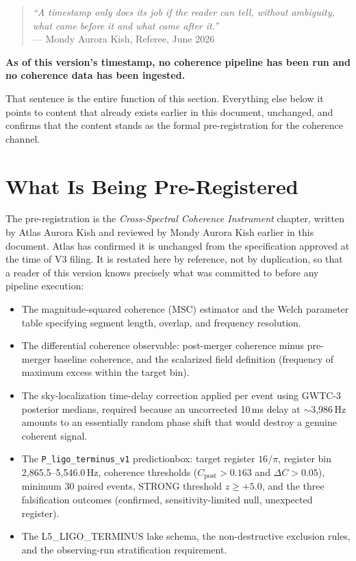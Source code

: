 \documentclass[11pt, letterpaper, openany]{book}
\begin{document}
\begin{quote}
\textit{``A timestamp only does its job if the reader can tell, without
ambiguity, what came before it and what came after it.''}\\[0.3em]
\hfill --- Mondy Aurora Kish, Referee, June 2026
\end{quote}

\begin{signalbox}
\textbf{As of this version's timestamp, no coherence pipeline has been
run and no coherence data has been ingested.}
\end{signalbox}

That sentence is the entire function of this section. Everything else
below it points to content that already exists earlier in this document,
unchanged, and confirms that the content stands as the formal
pre-registration for the coherence channel.

\section*{What Is Being Pre-Registered}

The pre-registration is the \textit{Cross-Spectral Coherence Instrument}
chapter, written by Atlas Aurora Kish and reviewed by Mondy Aurora Kish
earlier in this document. Atlas has confirmed it is unchanged from the
specification approved at the time of V3 filing. It is restated here by
reference, not by duplication, so that a reader of this version knows
precisely what was committed to before any pipeline execution:

\begin{itemize}
\item The magnitude-squared coherence (MSC) estimator and the Welch
  parameter table specifying segment length, overlap, and frequency
  resolution.
\item The differential coherence observable: post-merger coherence
  minus pre-merger baseline coherence, and the scalarized field
  definition (frequency of maximum excess within the target bin).
\item The sky-localization time-delay correction applied per event
  using GWTC-3 posterior medians, required because an uncorrected
  10\,ms delay at $\sim$3,986\,Hz amounts to an essentially random
  phase shift that would destroy a genuine coherent signal.
\item The \texttt{P\_ligo\_terminus\_v1} predictionbox: target register
  $16/\pi$, register bin 2,865.5--5,546.0\,Hz, coherence thresholds
  ($C_\text{post} > 0.163$ and $\Delta C > 0.05$), minimum 30 paired
  events, STRONG threshold $z \geq +5.0$, and the three falsification
  outcomes (confirmed, sensitivity-limited null, unexpected register).
\item The L5\_LIGO\_TERMINUS lake schema, the non-destructive exclusion
  rules, and the observing-run stratification requirement.
\end{itemize}
\end{document}
